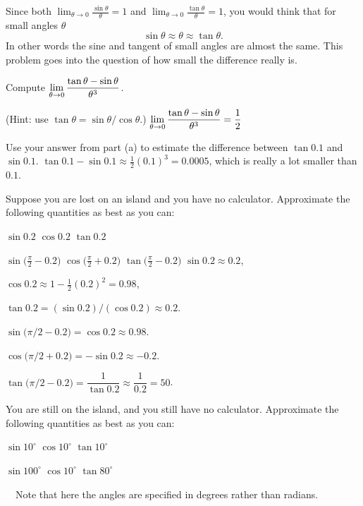 \begin{multicols}{2}\setlength{\parindent}{0pt}
\problem Since both $\lim_{\theta\to0}\frac{\sin\theta}{\theta} = 1$ and 
$\lim_{\theta\to0}\frac{\tan\theta}{\theta} = 1$, you would think that
for small angles $\theta$
\[
\sin\theta \approx \theta \approx \tan\theta.
\]
In other words the sine and tangent of small angles are almost the
same.  This problem goes into the question of how small the
difference really is.

\subprob Compute $\displaystyle \lim_{\theta\to0}\frac{\tan\theta -
\sin\theta}{\theta^3}$.  

(Hint:  use $\tan\theta = \sin\theta/\cos\theta$.)
\answer 
$\displaystyle \lim_{\theta\to0}\frac{\tan\theta - \sin\theta}{\theta^3} =
\frac{1}{2}$
\endanswer

\subprob  Use your answer from part (a) to estimate the difference
between $\tan 0.1$ and $\sin 0.1$.
\answer 
$\tan0.1 - \sin 0.1 \approx \frac{1}{2}(0.1)^{3} = 0.0005$, which is
really a lot smaller than $0.1$.
\endanswer

\problem Suppose you are lost on an island and you have no calculator. 
Approximate the following quantities as best as you can:

\subprob $\sin{0.2}$
\hfill
\subprob $\cos{0.2}$
\hfill
\subprob $\tan{0.2}$

\subprob $\sin\bigl(\frac\pi2 - {0.2}\bigr)$
\hfill
\subprob $\cos\bigl(\frac\pi2 + {0.2}\bigr)$
\hfill
\subprob $\tan\bigl(\frac\pi2 - {0.2}\bigr)$
\setcounter{SUBPROB}{0}
\answer 
$\sin0.2 \approx 0.2$,

$\cos{0.2} \approx 1-\frac12(0.2)^2 = 0.98$,

$\tan{0.2} = (\sin{0.2})/(\cos{0.2}) \approx 0.2$.

$\sin \bigl(\pi/2 - 0.2\bigr) = \cos 0.2 \approx 0.98$.

$\cos \bigl(\pi/2 + 0.2\bigr) = -\sin 0.2 \approx -0.2$.

$\tan \bigl(\pi/2 - 0.2\bigr) = \dfrac1{\tan 0.2} \approx \dfrac1{0.2} = 50$.

\endanswer
\problem You are still on the island, and you still have no 
calculator.  Approximate the following quantities as best as you can:

\subprob $\sin10^\circ$
\hfill
\subprob $\cos10^\circ$
\hfill
\subprob $\tan10^\circ$


\subprob $\sin100^\circ$
\hfill
\subprob $\cos10^\circ$
\hfill
\subprob $\tan80^\circ$

\carefulnow\ \  Note that here the angles are specified in degrees rather
than radians.


\end{multicols}
